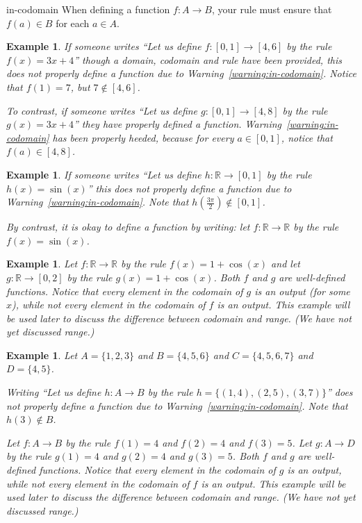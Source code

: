 \documentclass{book}
\newcounter{ekcounter}%
\theoremstyle{ekimcustom}
\newtheorem{example}[ekcounter]{Example}
\begin{document}
\begin{bwarning}{}{in-codomain}
When defining a function $f : A \to B$, your rule must ensure that $f(a) \in B$ for each $a \in A$.
\end{bwarning}
\begin{example}
If someone writes ``Let us define $f : [0,1] \to [4,6]$ by the rule $f(x) = 3x+4$'' though a domain, codomain and rule have been provided, this does not properly define a function due to Warning~\ref{warning:in-codomain}. Notice that $f(1)=7$, but $7 \not\in [4,6]$.

To contrast, if someone writes ``Let us define $g : [0,1] \to [4,8]$ by the rule $g(x) = 3x+4$'' they have properly defined a function. Warning~\ref{warning:in-codomain} has been properly heeded, because for every $a \in [0,1]$, notice that $f(a) \in [4,8]$.
\end{example}
\begin{example}
If someone writes ``Let us define $h : \mathbb{R} \to [0,1]$ by the rule $h(x) = \sin(x)$'' this does not properly define a function due to Warning~\ref{warning:in-codomain}. Note that $h(\frac{3\pi}{2}) \not\in [0,1]$.

By contrast, it is okay to define a function by writing: let $f : \mathbb{R} \to \mathbb{R}$ by the rule $f(x)=\sin(x)$.
\end{example}
\begin{example}\label{example:one-plus-cos-x-codomain-range}
Let $f : \mathbb{R} \to \mathbb{R}$ by the rule $f(x) = 1 + \cos(x)$ and let $g : \mathbb{R} \to [0,2]$ by the rule $g(x)=1+\cos(x)$. Both $f$ and $g$ are well-defined functions. Notice that every element in the codomain of $g$ is an output (for some $x$), while not every element in the codomain of $f$ is an output. This example will be used later to discuss the difference between codomain and range. (We have not yet discussed range.)
\end{example}
\begin{example}\label{example:discrete-codomain-range}
Let $A = \{1,2,3\}$ and $B = \{4,5,6\}$ and $C = \{4,5,6,7\}$ and $D = \{4,5\}$.

Writing ``Let us define $h : A \to B$ by the rule $h = \{(1,4),(2,5),(3,7)\}$'' does not properly define a function due to Warning~\ref{warning:in-codomain}. Note that $h(3) \not\in B$.

Let $f : A \to B$ by the rule $f(1)=4$ and $f(2)=4$ and $f(3)=5$. %
Let $g : A \to D$ by the rule $g(1)=4$ and $g(2)=4$ and $g(3)=5$. %
Both $f$ and $g$ are well-defined functions. Notice that every element in the codomain of $g$ is an output, while not every element in the codomain of $f$ is an output. This example will be used later to discuss the difference between codomain and range. (We have not yet discussed range.)
\end{example}
\end{document}
